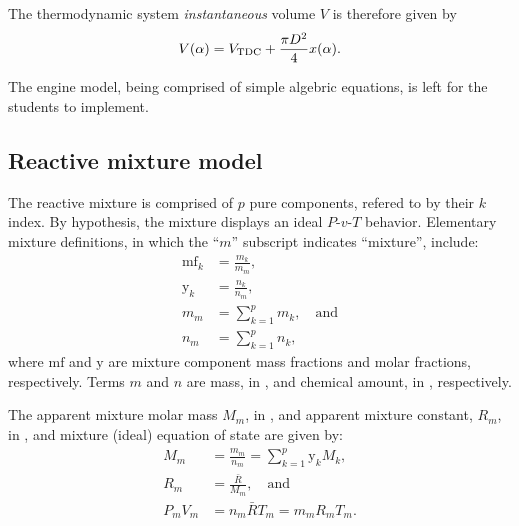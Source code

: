     The thermodynamic system \emph{instantaneous} volume $V$ is therefore given by%
    \begin{equation}
        \label{eq:V}
        V(\alpha) = V_{\mbox{\scriptsize TDC}} + \frac{\pi D^2}{4}x(\alpha).
    \end{equation}

    The engine model, being comprised of simple algebric equations, is left for the students to implement.


    \subsection{Reactive mixture model}\label{sec:model.reactm}

    The reactive mixture is comprised of $p$ pure components, refered to by their $k$ index. By hypothesis, the mixture displays an ideal $P$-$v$-$T$ behavior. Elementary mixture  definitions,
    in which the ``$m$'' subscript indicates ``mixture'', include:%
    \begin{align}
        \label{eq:mf}
        \mathrm{mf}_k   &= \frac{m_k}{m_m}, \\
        \label{eq:y}
        \mathrm{y}_k    &= \frac{n_k}{n_m}, \\
        \label{eq:mm}
        m_m             &= \sum_{k=1}^p m_k, \quad\mbox{and} \\
        \label{eq:nm}
        n_m             &= \sum_{k=1}^p n_k,
    \end{align}
    \noindent where $\mathrm{mf}$ and $\mathrm{y}$ are mixture component mass fractions and molar fractions, respectively. Terms $m$ and $n$ are mass, in \kilogram,  and  chemical  amount,  in
    \kilo\mole, respectively.

    The apparent mixture molar mass $M_m$, in \kilogram\per\kilo\mole, and apparent mixture constant, $R_m$, in \kilo\joule\per\kilogram\usk\kelvin, and mixture (ideal) equation of  state  are
    given by:%
    \begin{align}
        \label{eq:Mm}
        M_m         &= \frac{m_m}{n_m} = \sum_{k=1}^p \mathrm{y}_k M_k, \\
        \label{eq:Rm}
        R_m         &= \frac{\bar{R}}{M_m}, \quad\mbox{and} \\
        \label{eq:mEoS}
        P_mV_m      &= n_m\bar{R}T_m = m_mR_mT_m.
    \end{align}

